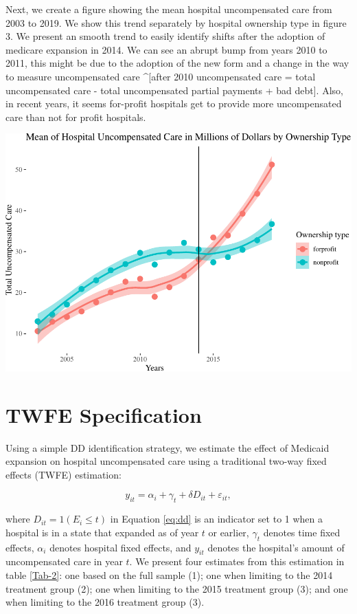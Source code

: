 \documentclass[
  12pt,
]{article}
\begin{document}
Next, we create a figure showing the mean hospital uncompensated care
from 2003 to 2019. We show this trend separately by hospital ownership
type in figure 3. We present an smooth trend to easily identify shifts
after the adoption of medicare expansion in 2014. We can see an abrupt
bump from years 2010 to 2011, this might be due to the adoption of the
new form and a change in the way to measure uncompensated care
\^{}{[}after 2010 uncompensated care = total uncompensated care - total
uncompensated partial payments + bad debt{]}. Also, in recent years, it
seems for-profit hospitals get to provide more uncompensated care than
not for profit hospitals.

\includegraphics{Report_files/figure-latex/Fig-3-1.pdf} \newpage

\hypertarget{twfe-specification}{%
\section{TWFE Specification}\label{twfe-specification}}

Using a simple DD identification strategy, we estimate the effect of
Medicaid expansion on hospital uncompensated care using a traditional
two-way fixed effects (TWFE) estimation:

\begin{equation}
\label{eq:dd}
y_{it} = \alpha_{i} + \gamma_{t} + \delta D_{it} + \varepsilon_{it},
\end{equation}

where \(D_{it}=1(E_{i}\leq t)\) in Equation \ref{eq:dd} is an indicator
set to 1 when a hospital is in a state that expanded as of year \(t\) or
earlier, \(\gamma_{t}\) denotes time fixed effects, \(\alpha_{i}\)
denotes hospital fixed effects, and \(y_{it}\) denotes the hospital's
amount of uncompensated care in year \(t\). We present four estimates
from this estimation in table \ref{Tab-2}: one based on the full sample
(1); one when limiting to the 2014 treatment group (2); one when
limiting to the 2015 treatment group (3); and one when limiting to the
2016 treatment group (3).
\end{document}
